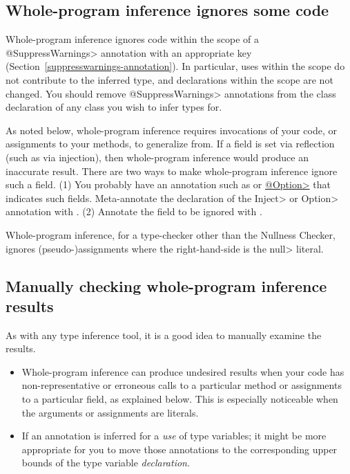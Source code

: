 \subsection{Whole-program inference ignores some code\label{whole-program-inference-ignores-some-code}}

Whole-program inference ignores code within the scope of a
\<@SuppressWarnings> annotation with an appropriate key
(Section~\ref{suppresswarnings-annotation}).  In particular, uses within
the scope do not contribute to the inferred type, and declarations within
the scope are not changed.  You should remove \<@SuppressWarnings> annotations
from the class declaration of any class you wish to infer types for.

As noted below, whole-program inference requires invocations of your code, or
assignments to your methods, to generalize from.  If a field is set via
reflection (such as via injection), then whole-program inference would produce
an inaccurate result.  There are two ways to make whole-program inference
ignore such a field.
%
(1)
You probably have an annotation such as
or
\href{https://types.cs.washington.edu/plume-lib/api/plume/Option.html}{\<@Option>}
that indicates such fields.  Meta-annotate the declaration of the \<Inject>
or \<Option> annotation with
.
%
(2)
Annotate the field to be ignored with
.

Whole-program inference, for a type-checker other than the Nullness Checker,
ignores (pseudo-)assignments where the right-hand-side is the \<null> literal.


\subsection{Manually checking whole-program inference results\label{whole-program-inference-manual-checking}}

As with any type inference tool, it is a good idea to manually examine the
results.

\begin{itemize}
\item
Whole-program inference can produce undesired results when your code has
non-representative or erroneous calls to a particular method or assignments to a
particular field, as explained below.
This is especially noticeable when the arguments or assignments are literals.

\item
If an annotation is inferred for a \emph{use} of type variables;
it might be more appropriate for you to move those annotations
to the corresponding upper bounds of the type variable \emph{declaration}.

\end{itemize}


